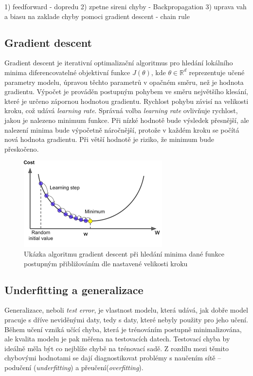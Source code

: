 1) feedforward - dopredu
2) zpetne sireni chyby - Backpropagation
3) uprava vah a biasu na zaklade chyby pomoci gradient descent
- chain rule



\subsection*{Gradient descent}
Gradient descent je iterativní optimalizační algoritmus pro hledání lokálního minima diferencovatelné objektivní funkce $J(\theta)$, kde $\theta \in \mathbb{R}^d$ reprezentuje učené parametry modelu, úpravou těchto parametrů v opačném směru, než je hodnota gradientu. Výpočet je prováděn postupným pohybem ve směru největšího klesání, které je určeno zápornou hodnotou gradientu. Rychlost pohybu závisí na velikosti kroku, což udává \textit{learning rate}. Správná volba \textit{learning rate} ovlivňuje rychlost, jakou je nalezeno minimum funkce. Při nízké hodnotě bude výsledek přesnější, ale nalezení minima bude výpočetně náročnější, protože v každém kroku se počítá nová hodnota gradientu. Při větší hodnotě je riziko, že minimum bude přeskočeno\cite{ruder2016overview}.
\begin{figure}[H]
    \centering
    \includegraphics[scale=0.7]{obrazky-figures/gradientdescent.png}
    \caption{\label{fig:gradientdescent}Ukázka algoritmu gradient descent při hledání minima dané funkce postupným přibližováním dle nastavené velikosti kroku}
\end{figure}




\subsection{Underfitting a generalizace}
Generalizace, neboli \textit{test error}, je vlastnost modelu, která udává, jak dobře model pracuje s dříve neviděnými daty, tedy s daty, které nebyly použity pro jeho učení. Během učení vzniká učící chyba, která je trénováním postupně minimalizována, ale kvalita modelu je pak měřena na testovacích datech. 
Testovací chyba by ideálně měla být co nejblíže chybě na trénovací sadě. Z rozdílu mezi těmito chybovými hodnotami se dají diagnostikovat problémy s naučením sítě -- podučení (\textit{underfitting}) a přeučení(\textit{overfitting}). 

